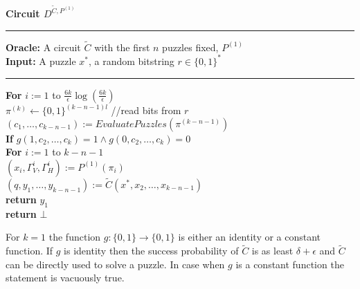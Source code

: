 %
%
%
\begin{codeblock}
  \textbf{Circuit $D^{\widetilde{C}, P^{(1)}}$}
  \medskip

  \hrule

  \medskip

  \textbf{Oracle:} A circuit $\widetilde{C}$ with the first $n$ puzzles fixed, $P^{(1)}$\\
  \textbf{Input:} A puzzle $x^*$, a random bitstring $r \in \{0,1\}^{*}$

  \medskip\hrule\medskip
  \textbf{For} $i:=1$ to $\frac{6k}{\epsilon} \log(\frac{6k}{\epsilon})$\\
  \IndI $\pi^{(k)} \leftarrow \{0,1\}^{(k-n-1)l}$ //read bits from $r$  \\
  \IndI $(c_1, \dots, c_{k-n-1}) := EvaluatePuzzles(\pi^{(k-n-1)})$\\
  \IndI \textbf{If} $g(1,c_2, \dots, c_k) =1 \land g(0,c_2, \dots, c_k) = 0$\\
  \IndII \textbf{For} $i:=1$ to $k-n-1$\\
  \IndIII $(x_i, \Gamma_V^{i}, \Gamma_H^{i}) := P^{(1)}(\pi_i)$\\
  \IndII $(q, y_1, \dots, y_{k-n-1}) := \widetilde{C}(x^*, x_2, \dots, x_{k-n-1})$\\
  \IndII \textbf{return} $y_1$\\
  \textbf{return} $\bot$ \\

\end{codeblock}
%
%
For $k=1$ the function $g: \{0,1\} \rightarrow \{0,1\}$ is either an identity or a constant function.
If $g$ is identity then the success probability of $\widetilde{C}$ is as least $\delta + \epsilon$
and $\widetilde{C}$ can be directly used to solve a puzzle. In case when $g$ is a constant function the statement is vacuously true.

